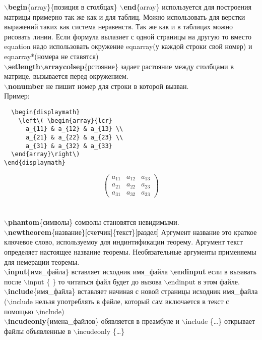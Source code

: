 \documentclass{article}
\newcommand{\bs}{$\backslash$}
\newcommand{\bd}[1]{{\bfseries #1}} %
\newcommand{\bb}[1]{\bd{\bs #1}} %
\begin{document}
\bb{begin}\{array\}\{позиция в столбцах\} \bb{end}\{array\} используется
для построения матрицы примерно так же как и для таблиц. Можно использовать
для верстки выражений таких как система неравенств. Так же как и в таблицах
можно рисовать линии. Если формула вылазиет с одной страницы на другую
то вместо equation надо использовать окружение
eqnarray(у каждой строки свой номер) и eqnarray*(номера не ставятся)\\
\bb{setlength}\bb{arraycolsep}\{рстояние\} задает растояние между столбцами в
матрице, вызывается перед окружением.\\
\bb{nonumber} не пишит номер для строки в которой вызван. \\
Пример:
\begin{verbatim}
  \begin{displaymath}
    \left\( \begin{array}{lcr}
      a_{11} & a_{12} & a_{13} \\
      a_{21} & a_{22} & a_{23} \\
      a_{31} & a_{32} & a_{33}
  \end{array}\right\)
\end{displaymath}
\end{verbatim}
\begin{displaymath}
  \left( \begin{array}{lcr}
    a_{11} & a_{12} & a_{13} \\
    a_{21} & a_{22} & a_{23} \\
    a_{31} & a_{32} & a_{33}
  \end{array}\right)
\end{displaymath}
\\\\

\bb{phantom}\{символы\} сомволы становятся невидимыми.\\
\bb{newtheorem}\{название\}[счетчик]\{текст\}[раздел] Аргумент название это
краткое ключевое слово, используемоу для индинтификации теорему.
Аргумент текст определяет настоящее название теоремы. Необязательные аргументы
применяемы для немерации теоремы.\\

\bb{input}\{имя\_файла\}  вставляет исходник имя\_файла
\bb{endinput} если в вызавать после \bs input \{ \} то читаться файл будет до
вызова \bs endinput в этом файле.\\
\bb{include}\{имя\_файла\} вставляет начиная с новой страницы исходник
имя\_файла (\bs include нельзя употреблять в файле,
который сам включается в текст с помощью \bs include)\\
\bb{incudeonly}\{имена\_файлов\} обявляется в преамбуле и \bs include \{\ldots\}
открывает файлы объявленные в \bs incudeonly \{\ldots\}\\
\end{document}
